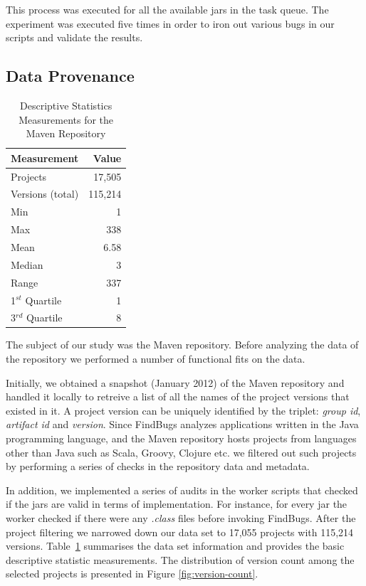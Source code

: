 \documentclass[conference]{IEEEtran}
\begin{document}
This process was executed for all the available {\sc jar}s in the task queue.
The experiment was executed five times in order to iron out various bugs in
our scripts and validate the results. 

\subsection{Data Provenance}
\label{sec:data}

\begin{table}
\centering
\caption{Descriptive Statistics Measurements for the Maven Repository}
\label{tbl:repository}
\begin{tabular}{l r}
\hline
Measurement & Value\\
 \hline
Projects & 17,505\\
Versions (total) & 115,214\\
Min & 1\\
Max & 338\\
Mean & 6.58\\
Median & 3\\
Range & 337\\
1$^{st}$ Quartile & 1\\
3$^{rd}$ Quartile & 8\\
\hline
\end{tabular}
\end{table}

The subject of our study was the Maven repository. Before analyzing the data of the
repository we performed a number of functional fits on the data. 

Initially, we obtained a snapshot (January 2012) of the Maven repository and
handled it locally to retreive a list of all the names of the project versions
that existed in it. A project version can be uniquely identified by the triplet:
{\it group id}, {\it artifact id} and {\it version}.
Since FindBugs analyzes applications written in the Java
programming language, and the Maven repository
hosts projects from languages other than Java such as Scala, Groovy,
Clojure etc. we filtered out such projects by performing a series of checks in
the repository data and metadata.

In addition, we implemented a series of audits in the worker scripts that
checked if the {\sc jar}s are valid in terms of implementation. For instance,
for every {\sc jar} the worker checked if there were any {\it .class} files
before invoking FindBugs. After the project filtering we narrowed down
our data set to 17,055 projects with 115,214 versions.
Table~\ref{tbl:repository} summarises the data set information and
provides the basic descriptive statistic measurements. The distribution of version
count among the selected projects is presented in Figure \ref{fig:version-count}.
\end{document}
